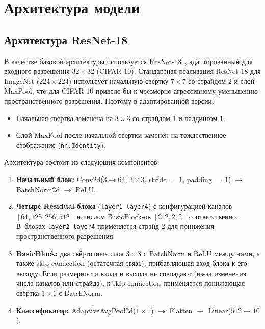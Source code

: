 \newpage
\section{Архитектура модели}

\subsection{Архитектура ResNet-18}

В качестве базовой архитектуры используется ResNet-18~\cite{resnet},
адаптированный для входного разрешения $32 \times 32$ (CIFAR-10). Стандартная
реализация ResNet-18 для ImageNet ($224 \times 224$) использует начальную
свёртку $7 \times 7$ со страйдом 2 и слой MaxPool, что для CIFAR-10 привело бы
к чрезмерно агрессивному уменьшению пространственного разрешения. Поэтому в
адаптированной версии:

\begin{itemize}
    \item Начальная свёртка заменена на $3 \times 3$ со страйдом 1 и паддингом 1.
    \item Слой MaxPool после начальной свёртки заменён на тождественное отображение (\texttt{nn.Identity}).
\end{itemize}

Архитектура состоит из следующих компонентов:

\begin{enumerate}
    \item \textbf{Начальный блок:} Conv2d($3 \to 64$, $3 \times 3$, stride~=~1, padding~=~1) $\to$ BatchNorm2d $\to$ ReLU.
    \item \textbf{Четыре Residual-блока} (\texttt{layer1}--\texttt{layer4}) с конфигурацией каналов $[64, 128, 256, 512]$ и числом BasicBlock-ов $[2, 2, 2, 2]$ соответственно. В~блоках \texttt{layer2}--\texttt{layer4} применяется страйд 2 для понижения пространственного разрешения.
    \item \textbf{BasicBlock:} два свёрточных слоя $3\times3$ с BatchNorm и ReLU между ними, а также skip-connection (остаточная связь), прибавляющая вход блока к его выходу. Если размерности входа и выхода не совпадают (из-за изменения числа каналов или страйда), к skip-connection применяется понижающая свёртка $1 \times 1$ с BatchNorm.
    \item \textbf{Классификатор:} AdaptiveAvgPool2d($1 \times 1$) $\to$ Flatten $\to$ Linear($512 \to 10$).
\end{enumerate}

